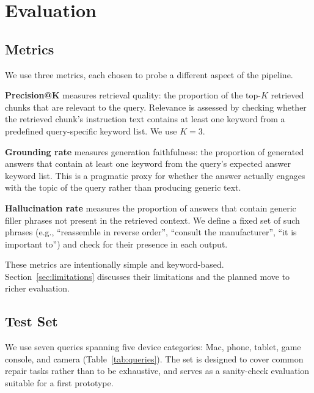 \documentclass[journal,onecolumn]{IEEEtran}
\begin{document}
\section{Evaluation}
\label{sec:evaluation}

\subsection{Metrics}

We use three metrics, each chosen to probe a different aspect of the
pipeline.

\textbf{Precision@K} measures retrieval quality: the proportion of the
top-$K$ retrieved chunks that are relevant to the query. Relevance is
assessed by checking whether the retrieved chunk's instruction text contains
at least one keyword from a predefined query-specific keyword list. We use
$K = 3$.

\textbf{Grounding rate} measures generation faithfulness: the proportion of
generated answers that contain at least one keyword from the query's expected
answer keyword list. This is a pragmatic proxy for whether the answer
actually engages with the topic of the query rather than producing generic
text.

\textbf{Hallucination rate} measures the proportion of answers that contain
generic filler phrases not present in the retrieved context. We define a
fixed set of such phrases (e.g., ``reassemble in reverse order'',
``consult the manufacturer'', ``it is important to'') and check for their
presence in each output.

These metrics are intentionally simple and keyword-based. Section~\ref{sec:limitations}
discusses their limitations and the planned move to richer evaluation.

\subsection{Test Set}

We use seven queries spanning five device categories: Mac, phone, tablet,
game console, and camera (Table~\ref{tab:queries}). The set is designed to
cover common repair tasks rather than to be exhaustive, and serves as a
sanity-check evaluation suitable for a first prototype.
\end{document}
